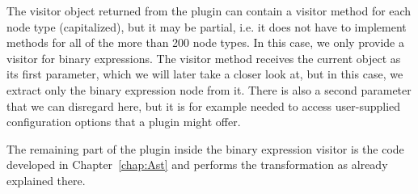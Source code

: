 The visitor object returned from the plugin
can contain a visitor method for each node type (capitalized),
but it may be partial, i.e.
it does not have to implement methods for all of the more than 200 node types.
In this case, we only provide a visitor for binary expressions.
The visitor method receives the current  object as its first parameter,
which we will later take a closer look at,
but in this case, we extract only the binary expression node from it.
There is also a second  parameter
that we can disregard here, but it is for example needed
to access user-supplied configuration options that a plugin might offer.

The remaining part of the plugin inside the binary expression visitor
is the code developed in Chapter~\ref{chap:Ast}
and performs the transformation as already explained there.
